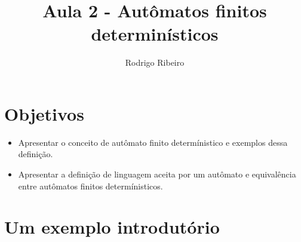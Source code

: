 \documentclass[a4paper]{article}
\theoremstyle{definition}
\begin{document}
  \title{Aula 2 - Autômatos finitos determinísticos}
  \author{Rodrigo Ribeiro}

  \maketitle


  \pagestyle{fancy}


  \section*{Objetivos}

  \begin{itemize}
     \item Apresentar o conceito de autômato finito determínistico
           e exemplos dessa definição.
     \item Apresentar a definição de linguagem aceita por um autômato
           e equivalência entre autômatos finitos determínisticos.
  \end{itemize}

  \section{Um exemplo introdutório}
\end{document}
